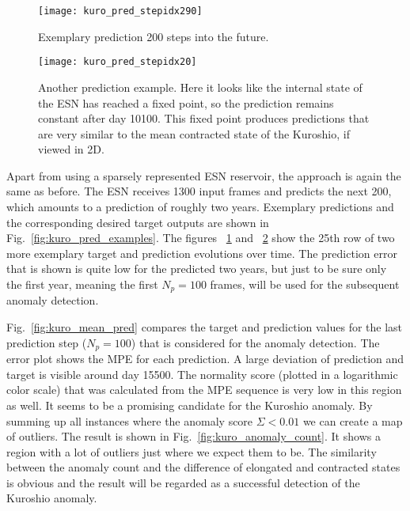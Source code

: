 \begin{figure}[p]
  \centering
  \texttt{[image: kuro\_pred\_stepidx290]}
  \caption{Exemplary prediction 200 steps into the future.}
  \label{fig:kuro_pred_stepidx290}
\end{figure}

\begin{figure}[p]
  \centering
  \texttt{[image: kuro\_pred\_stepidx20]}
  \caption{Another prediction example. Here it looks like the internal state of
  the ESN has reached a fixed point, so the prediction remains constant after
  day 10100.  This fixed point produces predictions that are very similar to
  the mean contracted state of the Kuroshio, if viewed in 2D.}
  \label{fig:kuro_pred_stepidx20}
\end{figure}



Apart from using a sparsely represented ESN reservoir, the approach is again
the same as before.  The ESN receives 1300 input frames and predicts the next
200, which amounts to a prediction of roughly two years. Exemplary predictions
and the corresponding desired target outputs are shown in
Fig.~\ref{fig:kuro_pred_examples}. The figures ~\ref{fig:kuro_pred_stepidx290}
and ~\ref{fig:kuro_pred_stepidx20} show the 25th row of two more exemplary
target and prediction evolutions over time. The prediction error that is shown
is quite low for the predicted two years, but just to be sure only the first
year, meaning the first $N_p = 100$ frames, will be used for the subsequent
anomaly detection.

Fig.~\ref{fig:kuro_mean_pred} compares the target and prediction values for the
last prediction step ($N_p=100$) that is considered for the anomaly detection.
The error plot shows the MPE for each prediction. A large deviation of
prediction and target is visible around day 15500. The normality score (plotted
in a logarithmic color scale) that was calculated from the MPE sequence is very
low in this region as well. It seems to be a promising candidate for the
Kuroshio anomaly. By summing up all instances where the anomaly score $\Sigma <
0.01$ we can create a map of outliers. The result is shown in
Fig.~\ref{fig:kuro_anomaly_count}.  It shows a region with a lot of outliers
just where we expect them to be.  The similarity between the anomaly count and
the difference of elongated and contracted states is obvious and the result
will be regarded as a successful detection of the Kuroshio anomaly.

